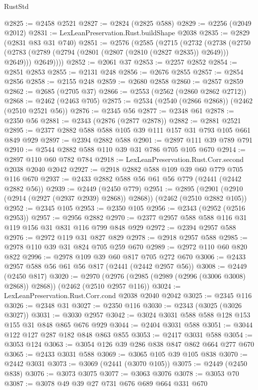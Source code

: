 \begin{lexlean}{RustStd}
\begin{coremodule}
@2825 := @2458 @2521
@2827 := @2824 (@2825 @588)
@2829 := @2256 (@2049 @2012)
@2831 := LexLeanPreservation.Rust.buildShape @2038
@2835 := @2829 (@2831 @83 @31 @740)
@2851 := @2576
    (@2585
      (@2715
        (@2732
          (@2738
            (@2750 (@2783 (@2789 (@2794 (@2801 (@2807 (@2810 (@2827 @2835)) @2649))) @2649)))
            @2649))))
@2852 := @2061 @37
@2853 := @2257 @2852
@2854 := @2851 @2853
@2855 := @2131 @248
@2856 := @2676 @2855
@2857 := @2854 @2856
@2858 := @2155 @248
@2859 := @2680 @2858
@2860 := @2857 @2859
@2862 := @2685 (@2705 @37)
@2866 := @2553 (@2562 (@2860 @2862 @2712))
@2868 := @2462 (@2463 @705)
@2875 := @2534 (@2540 (@2866 @2868)) (@2462 (@2510 @2521 @56))
@2876 := @2345 @56
@2877 := @2348 @61
@2878 := @2350 @56
@2881 := @2343 (@2876 (@2877 @2878))
@2882 := @2881 @2521
@2895 := @2377 @2882 @588 @588 @105 @39 @111 @157 @31 @793 @105 @661 @849 @929
@2897 := @2394 @2882 @588
@2901 := @2897 @111 @39 @789 @791
@2910 := @2544 @2882 @588 @110 @39 @31 @786 @705 @105 @670
@2914 := @2897 @110 @60 @782 @784
@2918 := LexLeanPreservation.Rust.Corr.second @2038 @2040 @2042
@2927 := @2918 @2882 @588 @109 @39 @60 @779 @705 @116 @670
@2937 := @2433 @2882 @588 @56 @61 @56 @779 (@2441 (@2442 @2882 @56))
@2939 := @2449 (@2450 @779)
@2951 := @2895 (@2901 (@2910 (@2914 (@2927 (@2937 @2939) @2868)) @2868)) (@2462 (@2510 @2882 @105))
@2952 := @2345 @105
@2953 := @2350 @105
@2956 := @2343 (@2952 (@2516 @2953))
@2957 := @2956 @2882
@2970 := @2377 @2957 @588 @588 @116 @31 @119 @156 @31 @831 @116 @799 @848 @929
@2972 := @2394 @2957 @588
@2976 := @2972 @119 @31 @827 @829
@2978 := @2918 @2957 @588
@2985 := @2978 @110 @39 @31 @824 @705 @259 @670
@2989 := @2972 @110 @60 @820 @822
@2996 := @2978 @109 @39 @60 @817 @705 @272 @670
@3006 := @2433 @2957 @588 @56 @61 @56 @817 (@2441 (@2442 @2957 @56))
@3008 := @2449 (@2450 @817)
@3020 := @2970 (@2976 (@2985 (@2989 (@2996 (@3006 @3008) @2868)) @2868)) (@2462 (@2510 @2957 @116))
@3024 := LexLeanPreservation.Rust.Corr.cond @2038 @2040 @2042
@3025 := @2345 @116
@3026 := @2348 @31
@3027 := @2350 @116
@3030 := @2343 (@3025 (@3026 @3027))
@3031 := @3030 @2957
@3042 := @3024 @3031 @588 @588 @128 @153 @155 @31 @848 @865 @676 @929
@3044 := @2404 @3031 @588
@3051 := @3044 @122 @127 @287 @182 @848 @863 @855
@3053 := @2417 @3031 @588
@3054 := @3053 @124
@3063 := @3054 @126 @39 @286 @838 @847 @862 @664 @277 @670
@3065 := @2433 @3031 @588
@3069 := @3065 @105 @39 @105 @838
@3070 := @2442 @3031
@3073 := @3069 (@2441 (@3070 @105))
@3075 := @2449 (@2450 @838)
@3076 := @3073 @3075
@3077 := @3063 @3076
@3078 := @3053 @70
@3087 := @3078 @49 @39 @27 @731 @676 @689 @664 @331 @670

\end{coremodule}
\end{lexlean}
